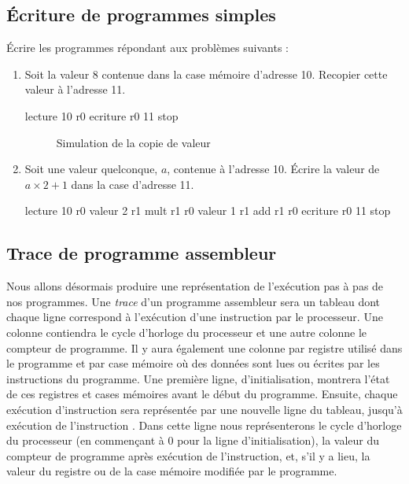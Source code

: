 \subsection{Écriture de programmes simples}
Écrire les programmes répondant aux problèmes suivants :
\begin{enumerate}
\item Soit la valeur 8 contenue dans la case mémoire d'adresse 10. Recopier cette valeur à l'adresse 11.
  \begin{correction}%
    \begin{listing}{1}
      lecture 10 r0
      ecriture r0 11
      stop
    \end{listing}

\begin{figure} %
  \centering
  
  \caption{Simulation de la copie de valeur}
  \label{trace_copie_val}
\end{figure}
  \end{correction}
\item Soit une valeur quelconque, $a$, contenue à l'adresse 10. Écrire
  la valeur de $a \times 2 + 1$ dans  la case d'adresse 11.
  \begin{correction}%
    \begin{listing}{1}
      lecture 10 r0
      valeur 2 r1
      mult r1 r0
      valeur 1 r1
      add r1 r0
      ecriture r0 11
      stop
    \end{listing}
  \end{correction}
\end{enumerate}

\subsection{Trace de programme assembleur}
Nous allons désormais produire une représentation de l'exécution pas à pas de nos programmes. Une \emph{trace} d'un programme assembleur sera un tableau dont chaque ligne correspond à l'exécution d'une instruction par le processeur.  Une colonne contiendra le cycle d'horloge du processeur et une autre colonne le compteur de programme. Il y aura également une colonne par registre utilisé dans le programme et par case mémoire où des données sont lues ou écrites par les instructions du programme. Une première ligne, d'initialisation, montrera l'état de ces registres et cases mémoires avant le début du programme. Ensuite, chaque exécution d'instruction sera représentée par une nouvelle ligne du tableau, jusqu'à exécution de l'instruction . Dans cette ligne nous représenterons le cycle d'horloge du processeur (en commençant à 0 pour la ligne d'initialisation),  la valeur du compteur de programme après exécution de l'instruction, et, s'il y a lieu, la valeur du registre ou de la case mémoire modifiée par le programme. 

